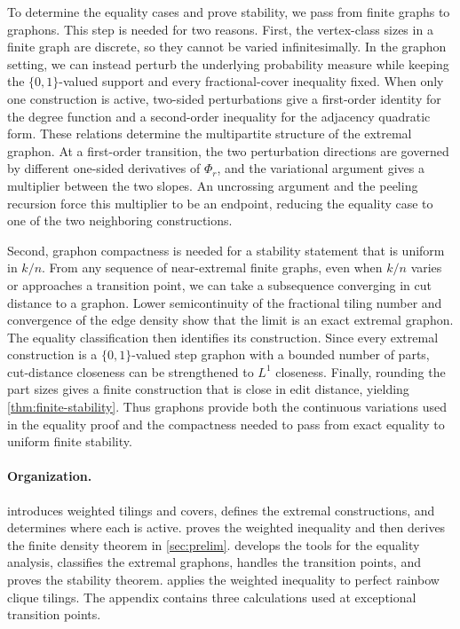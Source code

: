 \documentclass[10pt]{article}
\numberwithin{equation}{section}
\begin{document}
To determine the equality cases and prove stability, we pass from finite graphs to graphons.  This step is needed for two reasons.  First, the vertex-class sizes in a finite graph are discrete, so they cannot be varied infinitesimally.  In the graphon setting, we can instead perturb the underlying probability measure while keeping the $\{0,1\}$-valued support and every fractional-cover inequality fixed.  When only one construction is active, two-sided perturbations give a first-order identity for the degree function and a second-order inequality for the adjacency quadratic form.  These relations determine the multipartite structure of the extremal graphon.  At a first-order transition, the two perturbation directions are governed by different one-sided derivatives of $\Phi_r$, and the variational argument gives a multiplier between the two slopes.  An uncrossing argument and the peeling recursion force this multiplier to be an endpoint, reducing the equality case to one of the two neighboring constructions.

Second, graphon compactness is needed for a stability statement that is uniform in $k/n$.  From any sequence of near-extremal finite graphs, even when $k/n$ varies or approaches a transition point, we can take a subsequence converging in cut distance to a graphon.  Lower semicontinuity of the fractional tiling number and convergence of the edge density show that the limit is an exact extremal graphon.  The equality classification then identifies its construction.  Since every extremal construction is a $\{0,1\}$-valued step graphon with a bounded number of parts, cut-distance closeness can be strengthened to $L^1$ closeness.  Finally, rounding the part sizes gives a finite construction that is close in edit distance, yielding \cref{thm:finite-stability}.  Thus graphons provide both the continuous variations used in the equality proof and the compactness needed to pass from exact equality to uniform finite stability.

\paragraph{Organization.}
 introduces weighted tilings and covers, defines the extremal constructions, and determines where each is active.   proves the weighted inequality and then derives the finite density theorem in \cref{sec:prelim}.   develops the tools for the equality analysis, classifies the extremal graphons, handles the transition points, and proves the stability theorem.   applies the weighted inequality to perfect rainbow clique tilings.  The appendix contains three calculations used at exceptional transition points.
\end{document}
